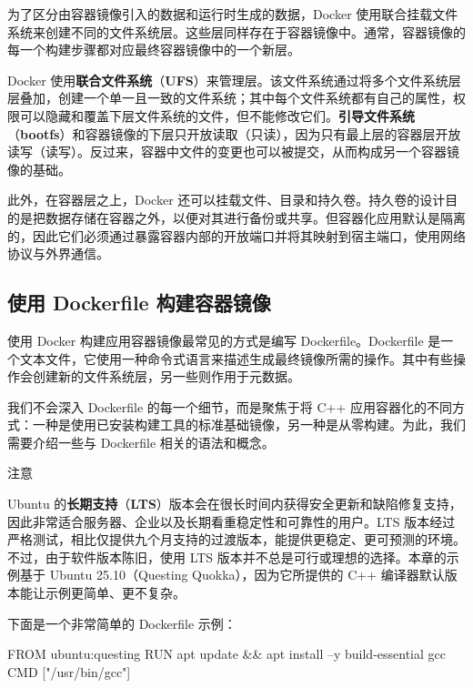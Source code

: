 为了区分由容器镜像引入的数据和运行时生成的数据，Docker 使用联合挂载文件系统来创建不同的文件系统层。这些层同样存在于容器镜像中。通常，容器镜像的每一个构建步骤都对应最终容器镜像中的一个新层。


\label{idx:1742}
\label{idx:1743}
Docker 使用\textbf{联合文件系统}（\textbf{UFS}）来管理层。该文件系统通过将多个文件系统层层叠加，创建一个单一且一致的文件系统；其中每个文件系统都有自己的属性，权限可以隐藏和覆盖下层文件系统的文件，但不能修改它们。\textbf{引导文件系统}（\textbf{bootfs}）和容器镜像的下层只开放读取（只读），因为只有最上层的容器层开放读写（读写）。反过来，容器中文件的变更也可以被提交，从而构成另一个容器镜像的基础。

\label{idx:1744}
\label{idx:1745}
此外，在容器层之上，Docker 还可以挂载文件、目录和持久卷。持久卷的设计目的是把数据存储在容器之外，以便对其进行备份或共享。但容器化应用默认是隔离的，因此它们必须通过暴露容器内部的开放端口并将其映射到宿主端口，使用网络协议与外界通信。

\subsection{使用 Dockerfile 构建容器镜像}

\label{idx:1746}
使用 Docker 构建应用容器镜像最常见的方式是编写 Dockerfile。Dockerfile 是一个文本文件，它使用一种命令式语言来描述生成最终镜像所需的操作。其中有些操作会创建新的文件系统层，另一些则作用于元数据。

\label{idx:1747}
我们不会深入 Dockerfile 的每一个细节，而是聚焦于将 C++ 应用容器化的不同方式：一种是使用已安装构建工具的标准基础镜像，另一种是从零构建。为此，我们需要介绍一些与 Dockerfile 相关的语法和概念。

\begin{myNotic}{注意}

\label{idx:1748}
Ubuntu 的\textbf{长期支持}（\textbf{LTS}）版本会在很长时间内获得安全更新和缺陷修复支持，因此非常适合服务器、企业以及长期看重稳定性和可靠性的用户。LTS 版本经过严格测试，相比仅提供九个月支持的过渡版本，能提供更稳定、更可预测的环境。不过，由于软件版本陈旧，使用 LTS 版本并不总是可行或理想的选择。本章的示例基于 Ubuntu 25.10（Questing Quokka），因为它所提供的 C++ 编译器默认版本能让示例更简单、更不复杂。
\end{myNotic}

下面是一个非常简单的 Dockerfile 示例：

\begin{codebox}[docker]
FROM ubuntu:questing
RUN apt update && apt install –y build-essential gcc
CMD ["/usr/bin/gcc"]
\end{codebox}

